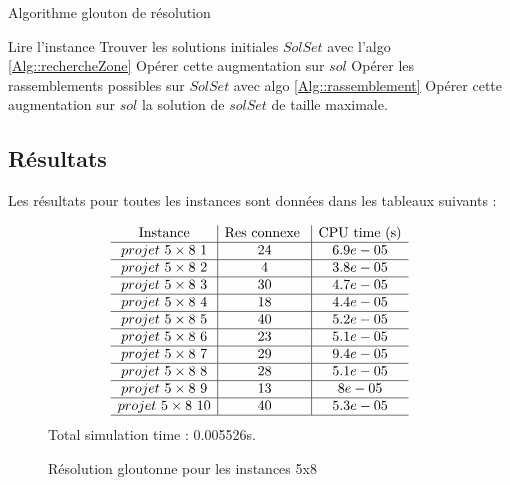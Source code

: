 \documentclass[12pt,a4paper]{article}
\begin{document}
	\begin{algorithm}
	\caption{Algorithme glouton de résolution}
	\begin{algorithmic}[1]
	\STATE Lire l'instance
	\STATE Trouver les solutions initiales $SolSet $ avec l'algo \ref{Alg::rechercheZone}
		\STATE Opérer cette augmentation sur $sol$
		\ENDWHILE
	\ENDFOR
	\STATE Opérer les rassemblements possibles sur $SolSet$ avec algo \ref{Alg::rassemblement}
		\STATE Opérer cette augmentation sur $sol$
		\ENDWHILE
	\ENDFOR
	 \RETURN la solution de $solSet$ de taille maximale.
	\end{algorithmic}
	 	\label{Alg::glouton total}
\end{algorithm}

\subsection{Résultats}

	Les résultats pour toutes les instances sont données dans les tableaux suivants :
	

\begin{figure}[H]
\centering

\[
\begin{array}{c|c|c}
\text{Instance} & \text{Res connexe }& \text{CPU time (s)} \\\hline
projet \ 5 \times 8 \ 1 &24 & 6.9e-05\\ \hline 
projet \ 5 \times 8 \ 2 &4 & 3.8e-05\\ \hline 
projet \ 5 \times 8 \ 3 &30 & 4.7e-05\\ \hline 
projet \ 5 \times 8 \ 4 &18 & 4.4e-05\\ \hline 
projet \ 5 \times 8 \ 5 &40 & 5.2e-05\\ \hline 
projet \ 5 \times 8 \ 6 &23 & 5.1e-05\\ \hline 
projet \ 5 \times 8 \ 7 &29 & 9.4e-05\\ \hline 
projet \ 5 \times 8 \ 8 &28 & 5.1e-05\\ \hline 
projet \ 5 \times 8 \ 9 &13 & 8e-05\\ \hline 
projet \ 5 \times 8 \ 10 &40 & 5.3e-05\\ \hline 
\end{array}\]
Total simulation time : 0.005526s.

\label{Res::Glouton 5x8}
\caption{Résolution gloutonne pour les instances 5x8}
\end{figure}
\end{document}
